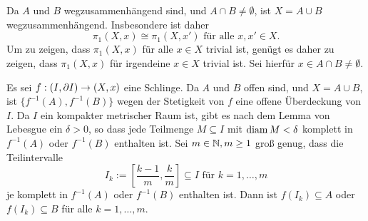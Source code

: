 \documentclass[a4paper,10pt]{article}
\begin{document}
\section{}


\subsection{}
Da $A$ und $B$ wegzusammenhängend sind, und $A \cap B \neq \emptyset$, ist $X = A \cup B$ wegzusammenhängend. Insbesondere ist daher
\[
 \pi_1(X,x) \cong \pi_1(X,x') \text{ für alle } x, x' \in X.
\]
Um zu zeigen, dass $\pi_1(X,x)$ für alle $x \in X$ trivial ist, genügt es daher zu zeigen, dass $\pi_1(X,x)$ für irgendeine $x \in X$ trivial ist. Sei hierfür $x \in A \cap B \neq \emptyset$.

Es sei $f : (I, \partial I) \to (X,x)$ eine Schlinge. Da $A$ und $B$ offen sind, und $X = A \cup B$, ist $\{f^{-1}(A), f^{-1}(B)\}$ wegen der Stetigkeit von $f$ eine offene Überdeckung von $I$. Da $I$ ein kompakter metrischer Raum ist, gibt es nach dem Lemma von Lebesgue ein $\delta > 0$, so dass jede Teilmenge $M \subseteq I$ mit $\operatorname{diam} M < \delta$ komplett in $f^{-1}(A)$ oder $f^{-1}(B)$ enthalten ist. Sei $m \in \mathbb{N}, m \geq 1$ groß genug, dass die Teilintervalle
\[
 I_k := \left[ \frac{k-1}{m}, \frac{k}{m} \right] \subseteq I \text{ für } k = 1, \ldots, m
\]
je komplett in $f^{-1}(A)$ oder $f^{-1}(B)$ enthalten ist. Dann ist $f(I_k) \subseteq A$ oder $f(I_k) \subseteq B$ für alle $k = 1, \ldots, m$.
\end{document}
